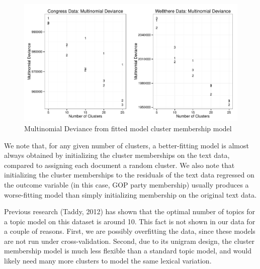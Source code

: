 \documentclass[12pt]{article}
\begin{document}
\begin{figure}[!htpb]
  \centering
  \includegraphics[width=6.2in]{Images/mdev_both.pdf}
  \caption[Multinomial Deviance: Congress Data]
   {Multinomial Deviance from fitted model cluster membership model}
\end{figure}


We note that, for any given number of clusters, a better-fitting model is almost always obtained by initializing the cluster memberships on the text data, compared to assigning each document a random cluster.
We also note that initializing the cluster memberships to the residuals of the text data regressed on the outcome variable (in this case, GOP party membership) usually produces a worse-fitting model than simply initializing membership on the original text data.


Previous research (Taddy, 2012) has shown that the optimal number of topics for a topic model on this dataset is around 10. This fact is not shown in our data for a couple of reasons. First, we are possibly overfitting the data, since these models are not run under cross-validation. Second, due to its unigram design, the cluster membership model is much less flexible than a standard topic model, and would likely need many more clusters to model the same lexical variation.

\end{document}
